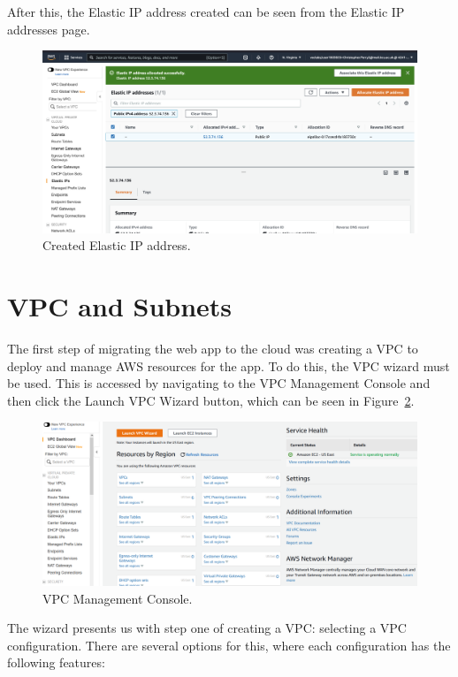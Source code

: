 After this, the Elastic IP address created can be seen from the Elastic IP addresses page.

\begin{figure}[!htbp]
    \centering
    \includegraphics[width=\textwidth]{resources/vpc/elastic_ip_addresses}
    \caption{Created Elastic IP address.}
    \label{fig:elastic-ip-addresses}
\end{figure}

\section{VPC and Subnets}\label{sec:vpc-and-subnets}

The first step of migrating the web app to the cloud was creating a VPC to deploy and manage AWS resources for the app.
To do this, the VPC wizard must be used.
This is accessed by navigating to the VPC Management Console and then click the Launch VPC Wizard button, which can be
seen in Figure~\ref{fig:vpc-wizard}.

\begin{figure}[!htbp]
    \centering
    \includegraphics[width=\textwidth]{resources/vpc/vpc-dashboard}
    \caption{VPC Management Console.}
    \label{fig:vpc-wizard}
\end{figure}

The wizard presents us with step one of creating a VPC: selecting a VPC configuration.
There are several options for this, where each configuration has the following features:

